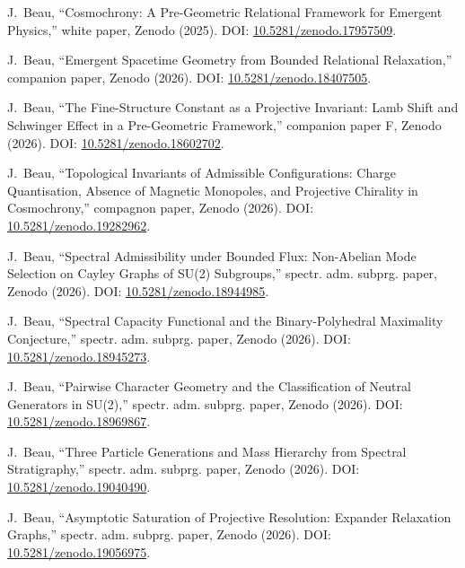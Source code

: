 J.~Beau,
``Cosmochrony: A Pre-Geometric Relational Framework for Emergent Physics,''
white paper, Zenodo (2025).
DOI: \href{https://doi.org/10.5281/zenodo.17957509}{10.5281/zenodo.17957509}.

J.~Beau,
``Emergent Spacetime Geometry from Bounded Relational Relaxation,''
companion paper, Zenodo (2026).
DOI: \href{https://doi.org/10.5281/zenodo.18407505}{10.5281/zenodo.18407505}.

J.~Beau,
``The Fine-Structure Constant as a Projective Invariant: Lamb Shift and Schwinger Effect in a Pre-Geometric Framework,''
companion paper F, Zenodo (2026).
DOI: \href{https://doi.org/10.5281/zenodo.18602702}{10.5281/zenodo.18602702}.

J.~Beau,
``Topological Invariants of Admissible Configurations: Charge Quantisation, Absence of Magnetic Monopoles, and
Projective Chirality in Cosmochrony,''
compagnon paper, Zenodo (2026).
DOI: \href{https://doi.org/10.5281/zenodo.19282962}{10.5281/zenodo.19282962}.

J.~Beau,
``Spectral Admissibility under Bounded Flux: Non-Abelian Mode Selection on Cayley Graphs of SU(2) Subgroups,''
spectr. adm. subprg. paper, Zenodo (2026).
DOI: \href{https://doi.org/10.5281/zenodo.18944985}{10.5281/zenodo.18944985}.

J.~Beau,
``Spectral Capacity Functional and the Binary-Polyhedral Maximality Conjecture,''
spectr. adm. subprg. paper, Zenodo (2026).
DOI: \href{https://doi.org/10.5281/zenodo.18945273}{10.5281/zenodo.18945273}.

J.~Beau,
``Pairwise Character Geometry and the Classification of Neutral Generators in SU(2),''
spectr. adm. subprg. paper, Zenodo (2026).
DOI: \href{https://doi.org/10.5281/zenodo.18969867}{10.5281/zenodo.18969867}.

J.~Beau,
``Three Particle Generations and Mass Hierarchy from Spectral Stratigraphy,''
spectr. adm. subprg. paper, Zenodo (2026).
DOI: \href{https://doi.org/10.5281/zenodo.19040490}{10.5281/zenodo.19040490}.

J.~Beau,
``Asymptotic Saturation of Projective Resolution: Expander Relaxation Graphs,''
spectr. adm. subprg. paper, Zenodo (2026).
DOI: \href{https://doi.org/10.5281/zenodo.19056975}{10.5281/zenodo.19056975}.

